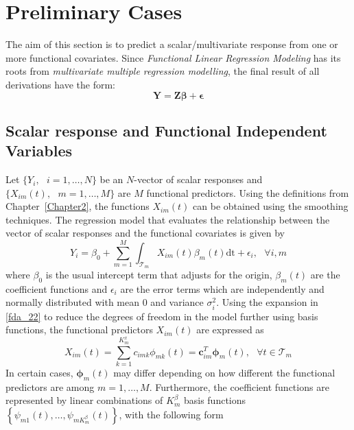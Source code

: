 \section{Preliminary Cases}

The aim of this section is to predict a scalar/multivariate response from one or more functional covariates. Since \textit{Functional Linear Regression Modeling} has its roots from \textit{multivariate multiple regression modelling}, the final result of all derivations have the form:
\begin{equation}
\bm{Y} = \bm{Z \beta} + \bm{\epsilon}
\end{equation}

\subsection{Scalar response and Functional Independent Variables}\label{sec:scalar_resp}
Let $\{Y_i,\text{ }i = 1,\dots,N \}$ be an $N$-vector of scalar responses and $\{X_{i m}(t),\text{ }m = 1,\dots,M\}$ are $M$ functional predictors. Using the definitions from Chapter~\ref{Chapter2}, the functions $X_{i m}(t)$ can be obtained using the smoothing techniques. The regression model that evaluates the relationship between the vector of scalar responses and the functional covariates is given by
\begin{equation}\label{eq:flrm_scalar}
Y_{i} = \beta_{0} + \sum_{m=1}^{M} \int_{\mathcal{T}_m} X_{i m}(t) \beta_{m}(t)\mathrm{dt} + \epsilon_{i}, \text{ } \forall i, m
\end{equation}
where $\beta_{0}$ is the usual intercept term that adjusts for the origin, $\beta_{m}(t)$ are the coefficient functions and $\epsilon_{i}$ are the error terms which are independently and normally distributed with mean $0$ and variance $\sigma^2_i$. Using the expansion in \eqref{fda_22} to reduce the degrees of freedom in the model further using basis functions, the functional predictors $X_{i m}(t)$ are expressed as
\begin{equation}\label{eq:covariates_scalar}
X_{i m}(t) = \sum_{k=1}^{K_m^{x}} c_{i m k} \phi_{m k} (t) = \bm{c}_{i m}^T \bm{\phi}_{m}(t),\text{ } \forall t \in \mathcal{T}_m
\end{equation}
In certain cases, $\bm{\phi}_{m}(t)$ may differ depending on how different the functional predictors are among $m=1,\dots,M$. Furthermore, the coefficient functions are represented by linear combinations of $K_m^{\beta}$ basis functions $\left\{\psi_{m 1}(t),\dots,\psi_{m K_m^{\beta}}(t) \right\}$, with the following form
